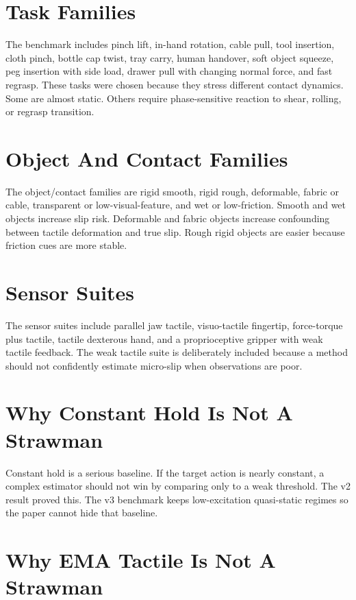 \documentclass{article}
\begin{document}
\appendix
\renewcommand{\thesection}{\arabic{section}}

\section{Task Families}

The benchmark includes pinch lift, in-hand rotation, cable pull, tool insertion, cloth pinch, bottle cap twist, tray carry, human handover, soft object squeeze, peg insertion with side load, drawer pull with changing normal force, and fast regrasp. These tasks were chosen because they stress different contact dynamics. Some are almost static. Others require phase-sensitive reaction to shear, rolling, or regrasp transition.

\section{Object And Contact Families}

The object/contact families are rigid smooth, rigid rough, deformable, fabric or cable, transparent or low-visual-feature, and wet or low-friction. Smooth and wet objects increase slip risk. Deformable and fabric objects increase confounding between tactile deformation and true slip. Rough rigid objects are easier because friction cues are more stable.

\section{Sensor Suites}

The sensor suites include parallel jaw tactile, visuo-tactile fingertip, force-torque plus tactile, tactile dexterous hand, and a proprioceptive gripper with weak tactile feedback. The weak tactile suite is deliberately included because a method should not confidently estimate micro-slip when observations are poor.

\section{Why Constant Hold Is Not A Strawman}

Constant hold is a serious baseline. If the target action is nearly constant, a complex estimator should not win by comparing only to a weak threshold. The v2 result proved this. The v3 benchmark keeps low-excitation quasi-static regimes so the paper cannot hide that baseline.

\section{Why EMA Tactile Is Not A Strawman}
\end{document}
